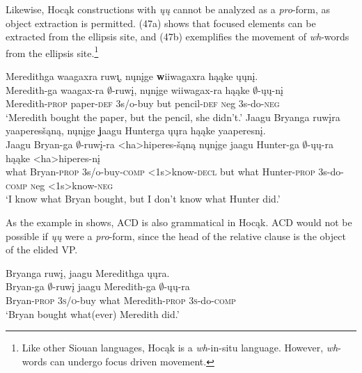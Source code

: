 \documentclass[output=paper]{LSP/langsci}
\begin{document}
Likewise, Hocąk constructions with \emph{ųų} cannot be analyzed as a \emph{pro}-form, as object extraction is permitted. (47a) shows that focused elements can be extracted from the ellipsis site, and (47b) exemplifies the movement of \emph{wh}-words from the ellipsis site.\footnote{Like other Siouan languages, Hocąk is a \emph{wh}-in-situ language. However, \emph{wh}-words can undergo focus driven movement.}

\begin{exe}
\ex
\begin{xlist}
\ex
\glll Meredithga waagaxra ruw\k{\i}, nųnįge {\textbf wiiwagaxra} hąąke ųųnį.\\
Meredith-ga waagax-ra $\emptyset$-ruwį, nųnįge wiiwagax-ra hąąke $\emptyset$-ųų-nį\\
Meredith-\textsc{prop} paper-\textsc{def} {\textsc 3s/o}-buy but pencil-\textsc{def} {\textsc neg} {\textsc 3s}-do-\textsc{neg}\\
\trans `Meredith bought the paper, but the pencil, she didn't.'
\ex
\glll Jaagu Bryanga ruwįra yaaperesšąną, nųnįge {\textbf jaagu} Hunterga ųųra hąąke yaaperesnį.\\
Jaagu Bryan-ga $\emptyset$-ruwį-ra <ha>hiperes-šąną nųnįge jaagu Hunter-ga $\emptyset$-ųų-ra hąąke <ha>hiperes-nį\\
what Bryan-\textsc{prop} {\textsc 3s/o}-buy-\textsc{comp} <{\textsc 1s}>know-\textsc{decl} but what Hunter-\textsc{prop} {\textsc 3s}-do-\textsc{comp} {\textsc neg} <{\textsc 1s}>know-\textsc{neg}\\
\trans `I know what Bryan bought, but I don't know what Hunter did.'
\end{xlist}
\end{exe}

As the example in  shows, ACD is also grammatical in Hocąk. ACD would not be possible if \emph{ųų} were a \emph{pro}-form, since the head of the relative clause is the object of the elided VP.

\begin{exe}
\ex
\glll Bryanga ruwį, jaagu Meredithga ųųra.\\
Bryan-ga $\emptyset$-ruwį jaagu Meredith-ga $\emptyset$-ųų-ra\\
Bryan-\textsc{prop} \textsc{3s/o}-buy what Meredith-\textsc{prop} \textsc{3s}-do-\textsc{comp}\\
\trans `Bryan bought what(ever) Meredith did.'
\end{exe}
\end{document}
